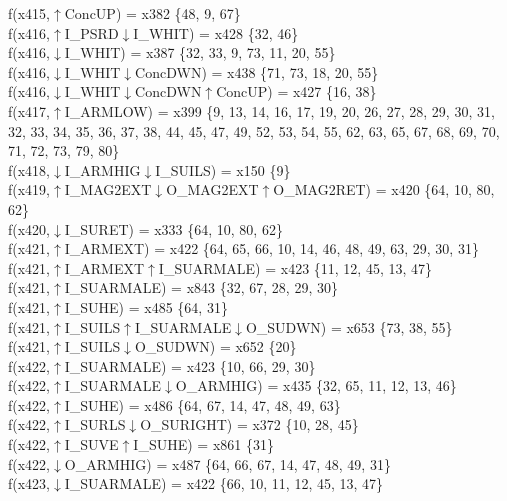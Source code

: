 f(x415,$\uparrow$ConcUP) = x382 \{48, 9, 67\} \\  
f(x416,$\uparrow$I\_PSRD$\downarrow$I\_WHIT) = x428 \{32, 46\} \\  
f(x416,$\downarrow$I\_WHIT) = x387 \{32, 33, 9, 73, 11, 20, 55\} \\  
f(x416,$\downarrow$I\_WHIT$\downarrow$ConcDWN) = x438 \{71, 73, 18, 20, 55\} \\  
f(x416,$\downarrow$I\_WHIT$\downarrow$ConcDWN$\uparrow$ConcUP) = x427 \{16, 38\} \\  
f(x417,$\uparrow$I\_ARMLOW) = x399 \{9, 13, 14, 16, 17, 19, 20, 26, 27, 28, 29, 30, 31, 32, 33, 34, 35, 36, 37, 38, 44, 45, 47, 49, 52, 53, 54, 55, 62, 63, 65, 67, 68, 69, 70, 71, 72, 73, 79, 80\} \\  
f(x418,$\downarrow$I\_ARMHIG$\downarrow$I\_SUILS) = x150 \{9\} \\  
f(x419,$\uparrow$I\_MAG2EXT$\downarrow$O\_MAG2EXT$\uparrow$O\_MAG2RET) = x420 \{64, 10, 80, 62\} \\  
f(x420,$\downarrow$I\_SURET) = x333 \{64, 10, 80, 62\} \\  
f(x421,$\uparrow$I\_ARMEXT) = x422 \{64, 65, 66, 10, 14, 46, 48, 49, 63, 29, 30, 31\} \\  
f(x421,$\uparrow$I\_ARMEXT$\uparrow$I\_SUARMALE) = x423 \{11, 12, 45, 13, 47\} \\  
f(x421,$\uparrow$I\_SUARMALE) = x843 \{32, 67, 28, 29, 30\} \\  
f(x421,$\uparrow$I\_SUHE) = x485 \{64, 31\} \\  
f(x421,$\uparrow$I\_SUILS$\uparrow$I\_SUARMALE$\downarrow$O\_SUDWN) = x653 \{73, 38, 55\} \\  
f(x421,$\uparrow$I\_SUILS$\downarrow$O\_SUDWN) = x652 \{20\} \\  
f(x422,$\uparrow$I\_SUARMALE) = x423 \{10, 66, 29, 30\} \\  
f(x422,$\uparrow$I\_SUARMALE$\downarrow$O\_ARMHIG) = x435 \{32, 65, 11, 12, 13, 46\} \\  
f(x422,$\uparrow$I\_SUHE) = x486 \{64, 67, 14, 47, 48, 49, 63\} \\  
f(x422,$\uparrow$I\_SURLS$\downarrow$O\_SURIGHT) = x372 \{10, 28, 45\} \\  
f(x422,$\uparrow$I\_SUVE$\uparrow$I\_SUHE) = x861 \{31\} \\  
f(x422,$\downarrow$O\_ARMHIG) = x487 \{64, 66, 67, 14, 47, 48, 49, 31\} \\  
f(x423,$\downarrow$I\_SUARMALE) = x422 \{66, 10, 11, 12, 45, 13, 47\} \\  
